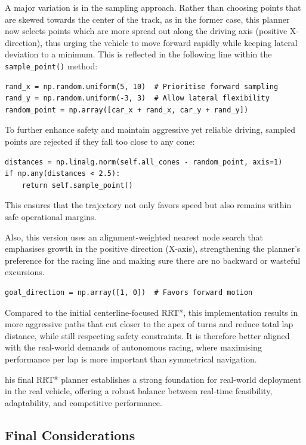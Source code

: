\documentclass[a4paper,11pt]{report}
\begin{document}
A major variation is in the sampling approach. Rather than choosing points that are
skewed towards the center of the track, as in the former case, this planner now selects
points which are more spread out along the driving axis (positive X-direction), thus
urging the vehicle to move forward rapidly while keeping lateral deviation to a minimum.
This is reflected in the following line within the \texttt{sample\_point()} method:


\begin{verbatim}
rand_x = np.random.uniform(5, 10)  # Prioritise forward sampling
rand_y = np.random.uniform(-3, 3)  # Allow lateral flexibility
random_point = np.array([car_x + rand_x, car_y + rand_y])
\end{verbatim}

To further enhance safety and maintain aggressive yet reliable driving, sampled points are rejected if they fall too close to any cone:

\begin{verbatim}
distances = np.linalg.norm(self.all_cones - random_point, axis=1)
if np.any(distances < 2.5):
    return self.sample_point()
\end{verbatim}

This ensures that the trajectory not only favors speed but also remains within safe operational margins.

Also, this version uses an alignment-weighted nearest node search that
emphasises growth in the positive direction (X-axis), strengthening the planner’s
preference for the racing line and making sure there are no backward or wasteful
excursions.

\begin{verbatim}
goal_direction = np.array([1, 0])  # Favors forward motion
\end{verbatim}

Compared to the initial centerline-focused RRT*, this implementation results in more
aggressive paths that cut closer to the apex of turns and reduce total lap distance,
while still respecting safety constraints. It is therefore better aligned with the real-world
demands of autonomous racing, where maximising performance per lap is more important than symmetrical navigation.

his final RRT* planner establishes a strong foundation for real-world deployment in the real vehicle, 
offering a robust balance between real-time feasibility, adaptability, and competitive performance.

\subsection{Final Considerations}
\end{document}
